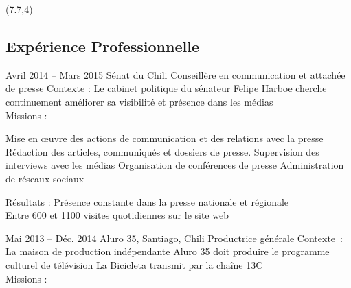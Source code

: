\documentclass[30pt, french]{tccv}
\begin{document}
\begin{upshape}

\begin{textblock}{13}(7.7,4)
\begin{mdframed}
\section{Expérience Professionnelle}


\begin{eventlist}

\setlength{\parskip}{0pt}
\item{Avril 2014 -- Mars 2015}
     {Sénat du Chili}
     {Conseillère en communication et attachée de presse}
     \fontsize{9pt}{1em}\color{text}\bodyfontlight\upshape\selectfont
     Contexte : Le cabinet politique du sénateur Felipe Harboe cherche continuement améliorer sa visibilité et présence dans les médias \\ 
     Missions : 

    \setlength{\parskip}{-10pt}
    \begin{itemize}
      \setlength\itemsep{-3pt} 
      \cvitem[\checkmark] Mise en œuvre des actions de communication et des relations avec la presse
      \cvitem[\checkmark] Rédaction des articles, communiqués et dossiers de presse. Supervision des interviews avec les médias
      \cvitem[\checkmark] Organisation de conférences de presse
      \cvitem[\checkmark] Administration de réseaux sociaux
    \end{itemize}     
    Résultats : Présence constante dans la presse nationale et régionale  \\
               Entre 600 et 1100 visites quotidiennes sur le site web 
               
\setlength{\parskip}{0pt}        
\item{Mai 2013 -- Déc. 2014}
     {Aluro 35, Santiago, Chili}
     {Productrice générale}
     \fontsize{9pt}{1em}\color{text}\bodyfontlight\upshape\selectfont
Contexte : La maison de production indépendante Aluro 35 doit produire le programme culturel de télévision La Bicicleta transmit par la chaîne 13C \\
Missions :
    

\end{eventlist}
\end{mdframed}
\end{textblock}
\end{upshape}
\end{document}
